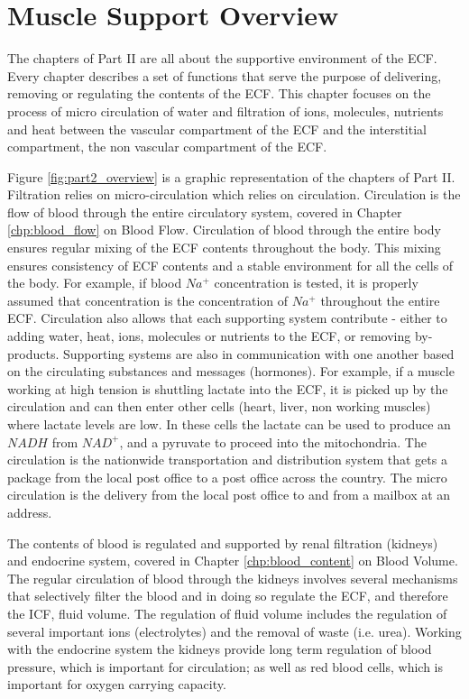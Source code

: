 \section{Muscle Support Overview}

The chapters of Part II are all about the supportive environment of the ECF. Every chapter describes a set of functions that serve the purpose of delivering, removing or regulating the contents of the ECF. This chapter focuses on the process of micro circulation of water and filtration of ions, molecules, nutrients and heat between the  vascular compartment of the ECF and the interstitial compartment, the non vascular compartment of the ECF.  

Figure \ref{fig:part2_overview} is a graphic representation of the chapters of Part II. Filtration relies on micro-circulation which relies on circulation. Circulation is the flow of blood through the entire circulatory system, covered in Chapter \ref{chp:blood_flow} on Blood Flow. Circulation of blood through the entire body ensures regular mixing of the ECF contents throughout the body. This mixing ensures consistency of ECF contents and a stable environment for all the cells of the body. For example, if blood $Na^+$ concentration is tested, it is properly assumed that concentration is the concentration of $Na^+$ throughout the entire ECF. Circulation also allows that each supporting system contribute - either to adding water, heat, ions, molecules or nutrients to the ECF, or removing by-products. Supporting systems are also in communication with one another based on the circulating substances and messages (hormones). For example, if a muscle working at high tension is shuttling lactate into the ECF, it is picked up by the circulation and can then enter other cells (heart, liver, non working muscles) where lactate levels are low. In these cells the lactate can be used to produce an $NADH$ from $NAD^+$, and a pyruvate to proceed into the mitochondria. The circulation is the nationwide transportation and distribution system that gets a package from the local post office to a post office across the country. The micro circulation is the delivery from the local post office to and from a mailbox at an address.

The contents of blood is regulated and supported by renal filtration (kidneys) and endocrine system, covered in Chapter \ref{chp:blood_content} on Blood Volume. The regular circulation of blood through the kidneys involves several mechanisms that selectively filter the blood and in doing so regulate the ECF, and therefore the ICF, fluid volume. The regulation of fluid volume includes the regulation of several important ions (electrolytes) and the removal of waste (i.e. urea). Working with the endocrine system the kidneys provide long term regulation of blood pressure, which is important for circulation; as well as red blood cells, which is important for oxygen carrying capacity.

